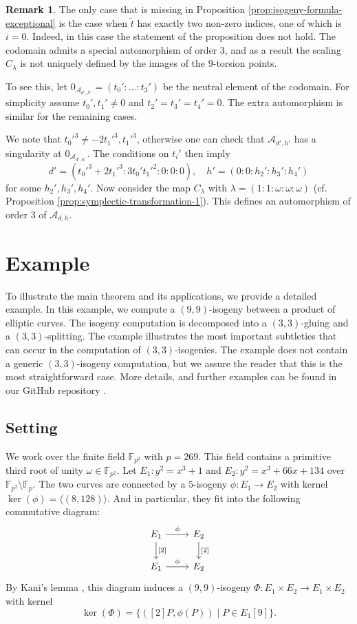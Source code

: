 \documentclass[11pt]{amsart}
\theoremstyle{definition}
\newtheorem{remark}[theorem]{Remark}
\newcommand{\A}{\mathcal{A}}
\newcommand{\FF}{\mathbb{F}}
\begin{document}
\begin{remark}
	The only case that is missing in  Proposition \ref{prop:isogeny-formula-exceptional} is the case when $\tilde{t}$ has exactly two non-zero indices, one of which is $i=0$. Indeed, in this case the statement of the proposition does not hold. The codomain admits a special automorphism of order $3$, and as a result the scaling $C_\lambda$ is not uniquely defined by the images of the $9$-torsion points.
	
	To see this, let $0_{\A_{d',h'}} = (t_0': \dots : t_3') $ be the neutral element of the codomain. For simplicity assume $t_0',t_1' \neq0$ and $t_2' = t_3' =t_4'=0$. The extra automorphism is similar for the remaining cases.
	
	We note that  $t_0'^3 \neq -2t_1'^3, t_1'^3$, otherwise one can check that $\A_{d',h'}$ has a singularity at $0_{\A_{d',h'}}$. The conditions on $t_i'$ then imply
	\[
	d' = (t_0'^3+2t_1'^3 : 3t_0't_1'^2:0:0:0), \quad h' = (0:0:h_2':h_3':h_4')
	\] 
	for some $h_2',h_3',h_4'$. Now consider the map $C_\lambda$ with $\lambda = (1:1:\omega:\omega:\omega)$ (cf. Proposition \ref{prop:symplectic-transformation-1}).  This defines an automorphism of order $3$ of $\A_{d,h}$.
\end{remark}


\section{Example} \label{sec:example}

To illustrate the main theorem and its applications, we provide a detailed example. In this example, we compute a $(9,9)$-isogeny between a product of elliptic curves. The isogeny computation is decomposed into a $(3,3)$-gluing and a $(3,3)$-splitting. The example illustrates the most important subtleties that can occur in the computation of $(3,3)$-isogenies. The example does not contain a generic $(3,3)$-isogeny computation, but we assure the reader that this is the most straightforward case. More details, and further examples can be found in our GitHub repository \cite{source_code}.

\subsection{Setting} We work over the finite field $\FF_{p^2}$  with $p = 269$. This field contains a primitive third root of unity $\omega \in \FF_{p^2}$. Let $E_1: y^2 = x^3 + 1$ and $E_2: y^2= x^3 + 66x + 134$ over $\FF_{p^2} \setminus \FF_p$. The two curves are connected by a $5$-isogeny $\phi: E_1 \to E_2$ with kernel $\ker(\phi) = \langle (8,128)\rangle$. And in particular, they fit into the following commutative diagram:
\[\begin{tikzcd}
    E_1 \arrow[r,"\phi"] \arrow[d, "{[2]}"] & E_2 \arrow[d, "{[2]}"]\\
    E_1 \arrow[r,"\phi"] & E_2
\end{tikzcd}\]
By Kani's lemma \cite{kani1997number}, this diagram induces a $(9,9)$-isogeny $\Phi: E_1 \times E_2 \to E_1 \times E_2$ with kernel
\[
\ker(\Phi) = \{ ([2]P, \phi(P)) \mid P \in E_1[9] \}.
\] 
\end{document}
